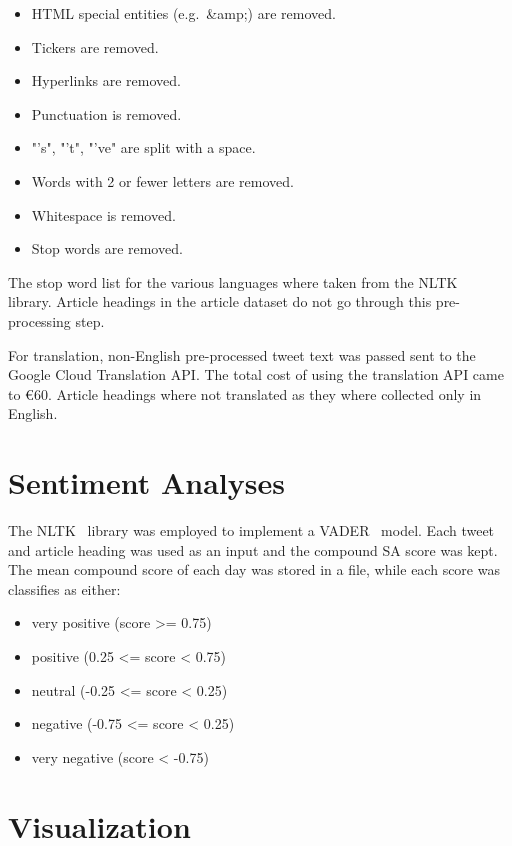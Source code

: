 \begin{itemize}
    \item HTML special entities (e.g.\ \&amp;) are removed.
    \item Tickers are removed.
    \item Hyperlinks are removed.
    \item Punctuation is removed.
    \item "'s", "'t", "'ve" are split with a space.
    \item Words with 2 or fewer letters are removed.
    \item Whitespace is removed.
    \item Stop words are removed.
\end{itemize}

\noindent The stop word list for the various languages where taken from the \ac{NLTK}~\citep{bird2009natural} library.
Article headings in the article dataset do not go through this pre-processing step.

For translation, non-English pre-processed tweet text was passed sent to the Google Cloud Translation \ac{API}.
The total cost of using the translation \ac{API} came to €60.
Article headings where not translated as they where collected only in English.

\section{Sentiment Analyses}

The \ac{NLTK}~\citep{bird2009natural} library was employed to implement a \ac{VADER}~\citep{Hutto_Gilbert_2014} model.
Each tweet and article heading was used as an input and the compound \ac{SA} score was kept.
The mean compound score of each day was stored in a file, while each score was classifies as either:

\begin{itemize}
    \item very positive (score >= 0.75)
    \item positive (0.25 <= score < 0.75)
    \item neutral (-0.25 <= score < 0.25)
    \item negative (-0.75 <= score < 0.25)
    \item very negative (score < -0.75)
\end{itemize}

\section{Visualization}

